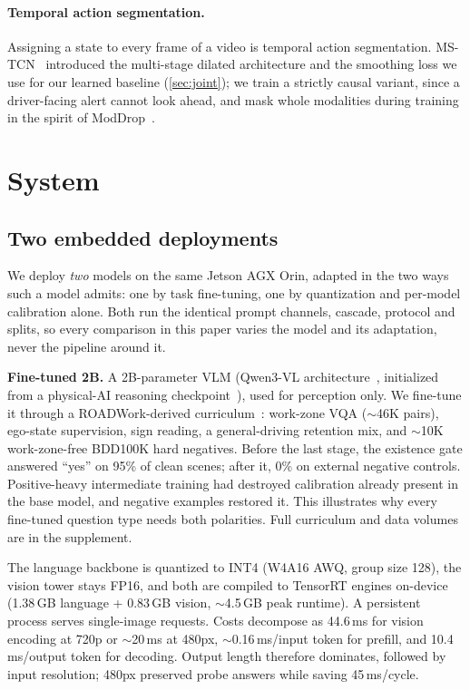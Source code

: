 \documentclass[journal]{IEEEtran}
\begin{document}
\paragraph{Temporal action segmentation.} Assigning a state to every frame of a video is temporal action segmentation.  MS-TCN~\cite{farha2019mstcn} introduced the multi-stage dilated architecture and the smoothing loss we use for our learned baseline (\cref{sec:joint}); we train a strictly causal variant, since a driver-facing alert cannot look ahead, and mask whole modalities during training in the spirit of ModDrop~\cite{neverova2016moddrop}.

\section{System}
\label{sec:system}

\subsection{Two embedded deployments}
\label{sec:deployment}

We deploy \emph{two} models on the same Jetson AGX Orin, adapted in the two ways such a model admits: one by task fine-tuning, one by quantization and per-model calibration alone.  Both run the identical prompt channels, cascade, protocol and splits, so every comparison in this paper varies the model and its adaptation, never the pipeline around it.

\textbf{Fine-tuned 2B.}  A 2B-parameter VLM (Qwen3-VL architecture~\cite{qwen3vl}, initialized from a physical-AI reasoning checkpoint~\cite{nvidia2025cosmosreason}), used for perception only.  We fine-tune it through a ROADWork-derived curriculum~\cite{ghosh2025roadwork}: work-zone VQA ($\sim$46K pairs), ego-state supervision, sign reading, a general-driving retention mix, and $\sim$10K work-zone-free BDD100K hard negatives.  Before the last stage, the existence gate answered ``yes'' on 95\% of clean scenes; after it, 0\% on external negative controls.  Positive-heavy intermediate training had destroyed calibration already present in the base model, and negative examples restored it.  This illustrates why every fine-tuned question type needs both polarities.  Full curriculum and data volumes are in the supplement.

The language backbone is quantized to INT4 (W4A16 AWQ, group size 128), the vision tower stays FP16, and both are compiled to TensorRT engines on-device~\cite{trtedgellm} (1.38\,GB language + 0.83\,GB vision, $\sim$4.5\,GB peak runtime).  A persistent process serves single-image requests.  Costs decompose as 44.6\,ms for vision encoding at 720p or $\sim$20\,ms at 480px, $\sim$0.16\,ms/input token for prefill, and 10.4\,ms/output token for decoding.  Output length therefore dominates, followed by input resolution; 480px preserved probe answers while saving 45\,ms/cycle.
\end{document}
